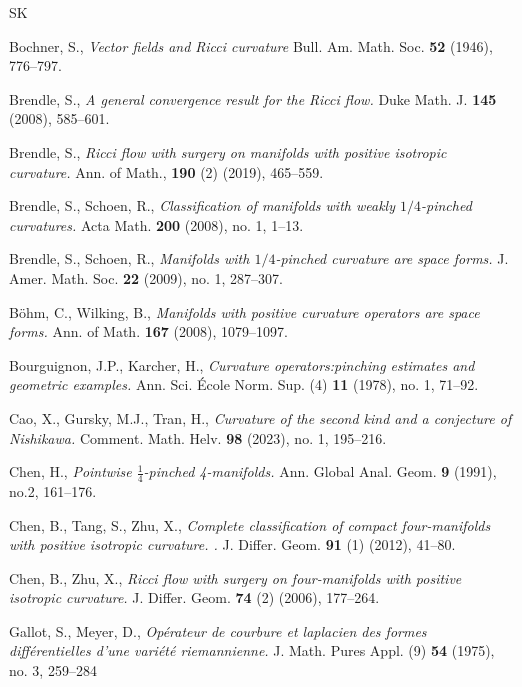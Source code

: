 \documentclass[12pt, twoside]{article}
\theoremstyle{definition}
\numberwithin{equation}{section}
\begin{document}
\bigskip
\footnotesize
\begin{thebibliography}{SK}

Bochner, S.,
\textit{Vector fields and Ricci curvature}
Bull. Am. Math. Soc. \textbf{52} (1946), 776--797.

Brendle, S.,
\textit{A general convergence result for the Ricci flow.}
Duke Math. J. \textbf{145} (2008), 585--601. 

Brendle, S.,
\textit{Ricci flow with surgery on manifolds with positive isotropic curvature.}
Ann. of Math., \textbf{190} (2) (2019), 465--559. 

Brendle, S., Schoen, R.,
\textit{Classification of manifolds with weakly $1/4$-pinched curvatures.} 
Acta Math. \textbf{200} (2008), no. 1, 1--13. 
 
Brendle, S., Schoen, R.,
\textit{Manifolds with $1/4$-pinched curvature are space forms.} 
J. Amer. Math. Soc. \textbf{22} (2009), no. 1, 287--307.

B\"{o}hm, C., Wilking, B.,
\textit{Manifolds with positive curvature operators are space forms.} Ann. of Math. \textbf{167} (2008), 1079--1097.

Bourguignon, J.P., Karcher, H.,
\textit{Curvature operators:pinching estimates and geometric examples.} 
Ann. Sci. \'{E}cole Norm. Sup. (4) \textbf{11} (1978), no. 1, 71--92.

 Cao, X., Gursky, M.J., Tran, H.,
 \textit{ Curvature of the second kind and a conjecture of Nishikawa.}  Comment. Math. Helv. \textbf{98} (2023), no. 1, 195--216. 



Chen, H.,
\textit{Pointwise $\frac{1}{4}$-pinched 4-manifolds.}
Ann. Global Anal. Geom. \textbf{9} (1991), no.2, 161--176. 

Chen, B., Tang, S., Zhu, X., 
\textit{Complete classification of compact four-manifolds with positive isotropic curvature. .}
J. Differ. Geom.  \textbf{91} (1)  (2012), 41--80.

Chen, B., Zhu, X., 
\textit{Ricci flow with surgery on four-manifolds with positive isotropic curvature.}
J. Differ. Geom.  \textbf{74} (2)  (2006), 177--264.

Gallot, S., Meyer, D.,
\textit{Op\'{e}rateur de courbure et laplacien des formes diff\'{e}rentielles d'une vari\'{e}t\'{e} riemannienne.}
J. Math. Pures Appl. (9) \textbf{54} (1975), no. 3, 259--284


\end{thebibliography}
\end{document}
